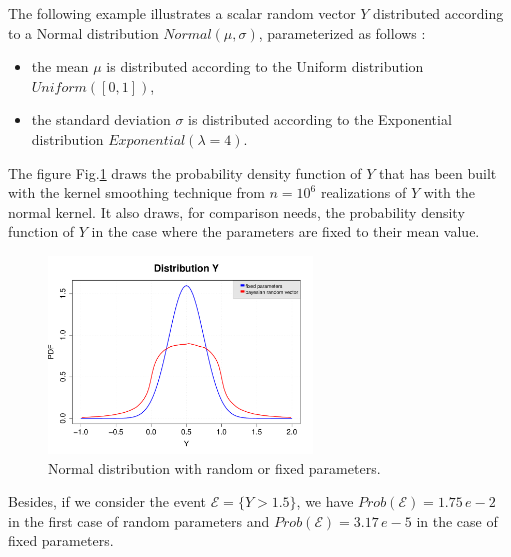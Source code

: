 The following example illustrates a scalar random vector $Y$ distributed according to a Normal distribution $Normal(\mu, \sigma)$, parameterized as follows : 
\begin{itemize}
  \item the mean $\mu$ is distributed according to the Uniform distribution $Uniform([0,1])$,
  \item the standard deviation $\sigma$ is distributed according to the Exponential distribution $Exponential(\lambda=4)$.
\end{itemize}

The figure Fig.\ref{DensitCond} draws the probability density function of $Y$ that has been built with the kernel smoothing technique from $n=10^6$ realizations of $Y$ with the normal kernel. It also draws, for comparison needs, the probability density function of $Y$ in the case where the parameters are fixed to their mean value.\\



\begin{figure}[H]
    \begin{center}
      \includegraphics[width=7cm]{pdf_bayesianRandomVector.pdf}
      \caption{Normal distribution with random or fixed parameters.}
      \label{DensitCond}
    \end{center}
\end{figure}




Besides, if we consider the event $\mathcal{E} = \{Y > 1.5\}$, we have $Prob(\mathcal{E})= 1.75\, e-2$ in the first case of random parameters and $Prob(\mathcal{E})= 3.17\, e-5$ in the case of fixed parameters.
